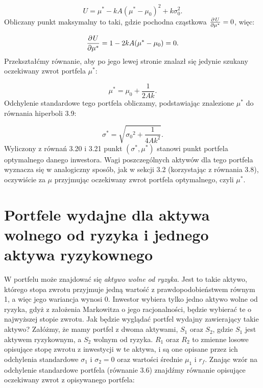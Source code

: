 \documentclass[magister]{dyplom}
\begin{document}
\begin{equation}
	U = \mu^* - kA(\mu^* - \mu_0)^2 + k\sigma_0^2.
\end{equation}
Obliczany punkt maksymalny to taki, gdzie pochodna cząstkowa $\frac{\partial\\U}{\partial\mu^*} = 0$, więc:

\begin{equation}
	\frac{\partial\\U}{\partial\mu^*} = 1 - 2kA(\mu^* - \mu_0) = 0.
\end{equation}
Przekształćmy równanie, aby po jego lewej stronie znalazł się jedynie szukany oczekiwany zwrot portfela $\mu^*$:

\begin{equation}
	\mu^* = \mu_0 + \frac{1}{2Ak}.
\end{equation}
Odchylenie standardowe tego portfela obliczamy, podstawiając znalezione $\mu^*$ do równania hiperboli 3.9:

\begin{equation}
	\sigma^* = \sqrt{{\sigma_0}^2+\frac{1}{4Ak^2}}.
\end{equation}
Wyliczony z równań 3.20 i 3.21 punkt $(\sigma^*, \mu^* )$ stanowi punkt portfela optymalnego danego inwestora. Wagi poszczególnych aktywów dla tego portfela wyznacza się w analogiczny sposób, jak w sekcji 3.2 (korzystając z równania 3.8), oczywiście za $\mu$ przyjmując oczekiwany zwrot portfela optymalnego, czyli $\mu^*$.

\section{Portfele wydajne dla aktywa wolnego od ryzyka i jednego aktywa ryzykownego}
W portfelu może znajdować się \textit{aktywo wolne od ryzyka}. Jest to takie aktywo, którego stopa zwrotu przyjmuje jedną wartość z prawdopodobieństwem równym 1, a więc jego wariancja wynosi 0. Inwestor wybiera tylko jedno aktywo wolne od ryzyka, gdyż z założenia Markowitza o jego racjonalności, będzie wybierać te o najwyższej stopie zwrotu. Jak będzie wyglądać portfel wydajny zawierający takie aktywo? Załóżmy, że mamy portfel z dwoma aktywami, $S_1$ oraz $S_2$, gdzie $S_1$ jest aktywem ryzykownym, a $S_2$ wolnym od ryzyka. $R_1$ oraz $R_2$ to zmienne losowe opisujące stopę zwrotu z inwestycji w te aktywa, i są one opisane przez ich odchylenia standardowe $\sigma_1$ i $\sigma_2 = 0$ oraz wartości średnie $\mu_1$ i $r_f$. Znając wzór na odchylenie standardowe portfela (równanie 3.6) znajdźmy równanie opisujące oczekiwany zwrot z opisywanego portfela:
\end{document}
